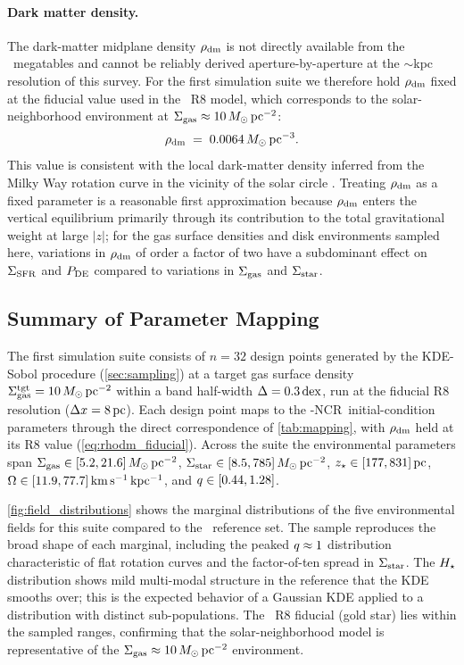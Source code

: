 \paragraph{Dark matter density.}
The dark-matter midplane density $\rho_{\rm dm}$ is not directly available from the
\PHANGS\ megatables and cannot be reliably derived aperture-by-aperture at the
$\sim$kpc resolution of this survey. For the first simulation suite we therefore
hold $\rho_{\rm dm}$ fixed at the fiducial value used in the \TIGRESS\ R8 model, which
corresponds to the solar-neighborhood environment at $\Sigma_{\rm gas} \approx 10\, M_{\odot}\,{\rm pc^{-2}}$:
\begin{equation}
  \rho_{\rm dm} \;=\; 0.0064\, M_{\odot}\,{\rm pc^{-3}}.
  \label{eq:rhodm_fiducial}
\end{equation}
This value is consistent with the local dark-matter density inferred from the
Milky Way rotation curve in the vicinity of the solar circle
\citep{2024ApJ...972...67K}. Treating $\rho_{\rm dm}$ as a fixed parameter is a
reasonable first approximation because $\rho_{\rm dm}$ enters the vertical equilibrium
primarily through its contribution to the total gravitational weight at large
$|z|$; for the gas surface densities and disk environments sampled here,
variations in $\rho_{\rm dm}$ of order a factor of two have a subdominant effect on
$\Sigma_{\rm SFR}$ and $P_{\rm DE}$ compared to variations in $\Sigma_{\rm gas}$ and $\Sigma_{\rm star}$.

\subsection{Summary of Parameter Mapping}
\label{sec:mapping_summary}

The first simulation suite consists of $n = 32$ design points generated by the
KDE-Sobol procedure (\autoref{sec:sampling}) at a target gas surface density
$\Sigma_{\rm gas}^{\rm tgt} = 10\, M_{\odot}\,{\rm pc^{-2}}$ within a band half-width $\Delta = 0.3\,{\rm dex}$, run at
the fiducial R8 resolution ($\Delta x = 8\,{\rm pc}$). Each design point maps to the
\TIGRESS-NCR\ initial-condition parameters through the direct correspondence of
\autoref{tab:mapping}, with $\rho_{\rm dm}$ held at its R8 value
(\autoref{eq:rhodm_fiducial}). Across the suite the environmental parameters
span $\Sigma_{\rm gas} \in [5.2, 21.6]\, M_{\odot}\,{\rm pc^{-2}}$, $\Sigma_{\rm star} \in [8.5, 785]\, M_{\odot}\,{\rm pc^{-2}}$,
$z_\star \in [177, 831]\,{\rm pc}$,
$\Omega \in [11.9, 77.7]\,{\rm km\,s^{-1}\,kpc^{-1}}$, and
$q \in [0.44, 1.28]$.

\autoref{fig:field_distributions} shows the marginal distributions of the five
environmental fields for this suite compared to the \PHANGS\ reference set. The
sample reproduces the broad shape of each marginal, including the peaked
$q \approx 1$ distribution characteristic of flat rotation curves and the
factor-of-ten spread in $\Sigma_{\rm star}$. The $H_\star$ distribution shows mild
multi-modal structure in the reference that the KDE smooths over; this is the
expected behavior of a Gaussian KDE applied to a distribution with distinct
sub-populations. The \TIGRESS\ R8 fiducial (gold star) lies within the sampled
ranges, confirming that the solar-neighborhood model is representative of the
$\Sigma_{\rm gas} \approx 10\, M_{\odot}\,{\rm pc^{-2}}$ environment.

